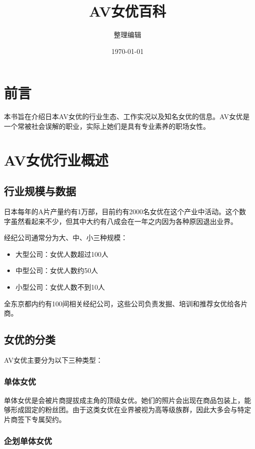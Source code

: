 \documentclass[12pt,UTF8]{ctexbook}
\title{\heiti\zihao{0} AV女优百科}
\author{整理编辑}
\date{\today}
\begin{document}
\maketitle
\tableofcontents

\frontmatter
\chapter{前言}

本书旨在介绍日本AV女优的行业生态、工作实况以及知名女优的信息。AV女优是一个常被社会误解的职业，实际上她们是具有专业素养的职场女性。

\mainmatter

\chapter{AV女优行业概述}

\section{行业规模与数据}

日本每年的A片产量约有1万部，目前约有2000名女优在这个产业中活动。这个数字虽然看起来不少，但其中大约有八成会在一年之内因为各种原因退出业界。

经纪公司通常分为大、中、小三种规模：
\begin{itemize}
\item 大型公司：女优人数超过100人
\item 中型公司：女优人数约50人
\item 小型公司：女优人数不到10人
\end{itemize}

全东京都内约有100间相关经纪公司，这些公司负责发掘、培训和推荐女优给各片商。

\section{女优的分类}

AV女优主要分为以下三种类型：

\subsection{单体女优}

单体女优是会被片商提拔成主角的顶级女优。她们的照片会出现在商品包装上，能够形成固定的粉丝团。由于这类女优在业界被视为高等级族群，因此大多会与特定片商签下专属契约。

\subsection{企划单体女优}
\end{document}

